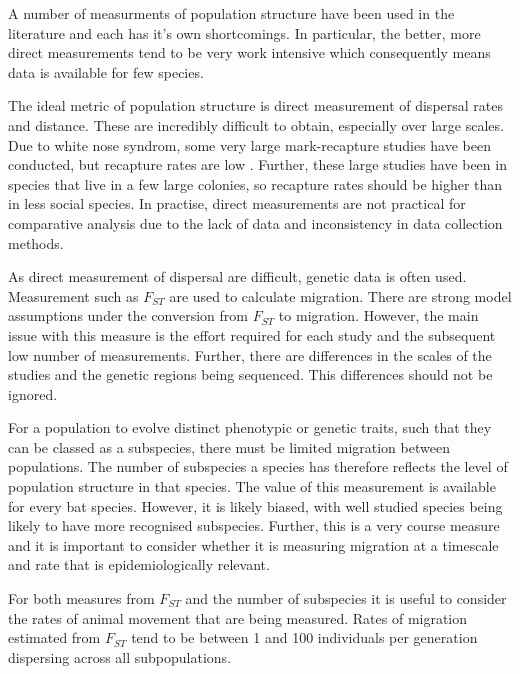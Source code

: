 
A number of measurments of population structure have been used in the literature and each has it's own shortcomings.
In particular, the better, more direct measurements tend to be very work intensive which consequently means data is available for few species.


The ideal metric of population structure is direct measurement of dispersal rates and distance.
These are incredibly difficult to obtain, especially over large scales.
Due to white nose syndrom, some very large mark-recapture studies have been conducted, but recapture rates are low \cite{norquay2013long}.
Further, these large studies have been in species that live in a few large colonies, so recapture rates should be higher than in less social species.
In practise, direct measurements are not practical for comparative analysis due to the lack of data and inconsistency in data collection methods.



As direct measurement of dispersal are difficult, genetic data is often used.
Measurement such as $F_{ST}$ are used to calculate migration.
There are strong model assumptions under the conversion from $F_{ST}$ to migration.
However, the main issue with this measure is the effort required for each study and the subsequent low number of measurements.
Further, there are differences in the scales of the studies and the genetic regions being sequenced.
This differences should not be ignored.


For a population to evolve distinct phenotypic or genetic traits, such that they can be classed as a subspecies, there must be limited migration between populations.
The number of subspecies a species has therefore reflects the level of population structure in that species.
The value of this measurement is available for every bat species.
However, it is likely biased, with well studied species being likely to have more recognised subspecies.
Further, this is a very course measure and it is important to consider whether it is measuring migration at a timescale and rate that is epidemiologically relevant.

For both measures from $F_{ST}$ and the number of subspecies it is useful to consider the rates of animal movement that are being measured.
Rates of migration estimated from $F_{ST}$ tend to be between 1 and 100 individuals per generation dispersing across all subpopulations.


